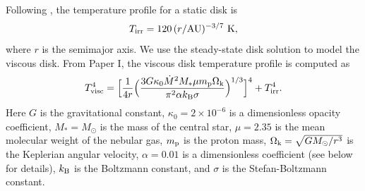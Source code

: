 \documentclass[apj]{emulateapj}
\begin{document}
Following \citet{chiang10}, the temperature profile for a static disk is
\begin{equation}
\label{eq:diskT}
T_{\rm irr} = 120\, (r/\text{AU})^{-3/7} \,\,\text{K},
\end{equation}
where $r$ is the semimajor axis. We use the \citet{shakura73}  steady-state disk solution to model the viscous disk. From Paper I, the viscous disk temperature profile is computed as %
\begin{equation}
\label{eq:activeT}
T_{\rm visc}^4 =\Big[\frac{1}{4 r} \Big(\frac{3 G \kappa_0\dot{M}^2 M_* \mu m_{\rm p} \Omega_{\rm k}}{\pi^2 \alpha k_{\rm B} \sigma}\Big)^{1/3}\Big]^4 + T_{\rm irr}^4.
\end{equation}
Here $G$ is the gravitational constant, $\kappa_0=2 \times 10^{-6}$ is a dimensionless opacity coefficient, $M_*=M_{\odot}$ is the mass of the central star, $\mu=2.35$ is the mean molecular weight of the nebular gas, $m_{\rm p}$ is the proton mass, $\Omega_{\rm k}=\sqrt{G M_{\odot}/r^3}$ is the Keplerian angular velocity, $\alpha=0.01$ is a dimensionless coefficient (see below for details), $k_{\rm B}$ is the Boltzmann constant, and $\sigma$ is the Stefan-Boltzmann constant. 

\end{document}

